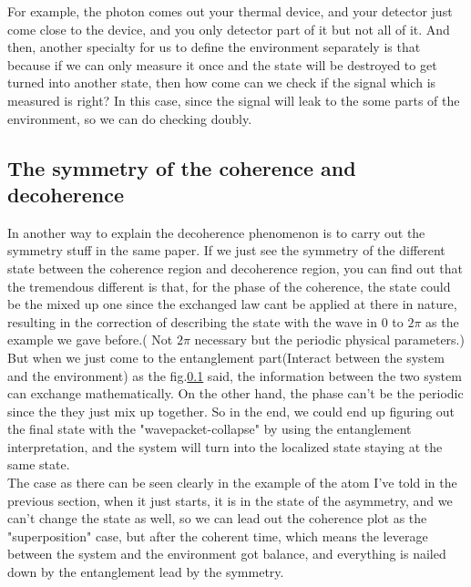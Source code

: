 \documentclass[final,1p,12pt]{elsarticle}
\begin{document}
For example, the photon comes out your thermal device, and your detector just come close to the device, and you only detector part of it but not all of it. And then, another specialty for us to define the environment separately is that because if we can only measure it once and the state will be destroyed to get turned into another state, then how come can we check if the signal which is measured is right? In this case, since the signal will leak to the some parts of the environment, so we can do checking doubly.\\

\subsection{The symmetry of the coherence and decoherence}
In another way to explain the decoherence phenomenon is to carry out the symmetry stuff in the same paper. If we just see the symmetry of the different state between the coherence region and decoherence region, you can find out that the tremendous different is that, for the phase of the coherence, the state could be the mixed up one since the exchanged law cant be applied at there in nature, resulting in the correction of describing the state with the wave in 0 to $2\pi$ as the example we gave before.( Not $2\pi$ necessary but the periodic physical parameters.) But when we just come to the entanglement part(Interact between the system and the environment) as the fig.\ref{} said, the information between the two system can exchange mathematically. On the other hand, the phase can't be the periodic since the they just mix up together. So in the end, we could end up figuring out the final state with the "wavepacket-collapse" by using the entanglement interpretation, and the system will turn into the localized state staying at the same state. \\

The case as there can be seen clearly in the example of the atom I've told in the previous section, when it just starts, it is in the state of the asymmetry, and we can't change the state as well, so we can lead out the coherence plot as the "superposition" case, but after the coherent time, which means the leverage between the system and the environment got balance, and everything is nailed down by the entanglement lead by the symmetry.\\
\end{document}
